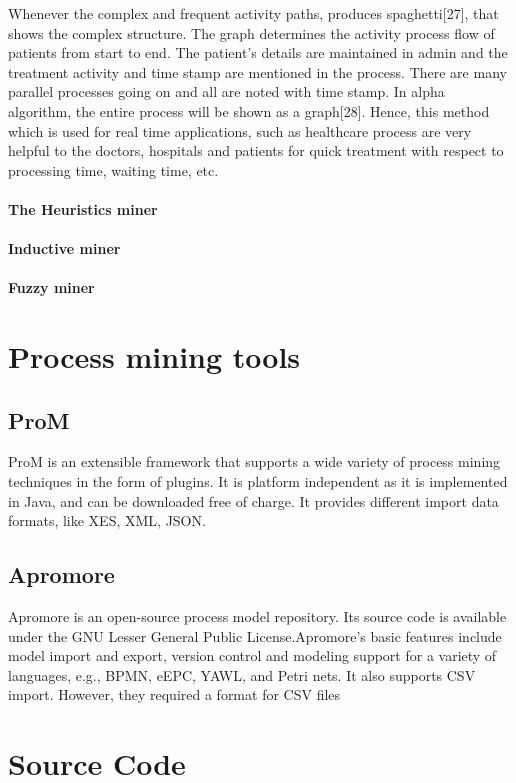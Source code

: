 Whenever the complex and frequent activity paths, produces spaghetti[27], that shows the complex structure. The graph determines the activity process flow of patients from start to end. The patient’s details are maintained in admin and the treatment activity and time stamp are mentioned in the process. There are many parallel processes going on and all are noted with time stamp. In alpha algorithm, the entire process will be shown as a graph[28]. Hence, this method which is used for real time applications, such as healthcare process are very helpful to the doctors, hospitals and patients for quick treatment with respect to processing time, waiting time, etc.

\paragraph{The Heuristics miner}
\paragraph{Inductive miner}
\paragraph{Fuzzy miner}






\section{Process mining tools}
\subsection{ProM}
ProM is an extensible framework that supports a wide variety of process mining techniques in the form of plugins. 
It is platform independent as it is implemented in Java, and can be downloaded free of charge. It provides different import data formats, like XES, XML, JSON.
\subsection{Apromore}
Apromore is an open-source process model repository. Its source code is available under the GNU Lesser General Public License.Apromore’s basic features include model import and export, version control and modeling support for a variety of languages, e.g., BPMN,
eEPC, YAWL, and Petri nets. It also supports CSV import. However, they required a format for CSV files 

\section{Source Code}

